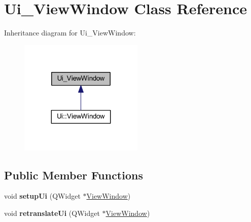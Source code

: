 \hypertarget{class_ui___view_window}{}\section{Ui\+\_\+\+View\+Window Class Reference}
\label{class_ui___view_window}


Inheritance diagram for Ui\+\_\+\+View\+Window\+:\nopagebreak
\begin{figure}[H]
\begin{center}
\leavevmode
\includegraphics[width=167pt]{class_ui___view_window__inherit__graph}
\end{center}
\end{figure}
\subsection*{Public Member Functions}
\begin{DoxyCompactItemize}
\item 
\mbox{\label{class_ui___view_window_ae518c45a0141518ec16947cbf5eee3fb}} 
void {\bfseries setup\+Ui} (Q\+Widget $\ast$\mbox{\hyperlink{class_view_window}{View\+Window}})
\item 
\mbox{\label{class_ui___view_window_a6f1b9fe6e15e336d2a9821ffbbcc561e}} 
void {\bfseries retranslate\+Ui} (Q\+Widget $\ast$\mbox{\hyperlink{class_view_window}{View\+Window}})
\end{DoxyCompactItemize}
